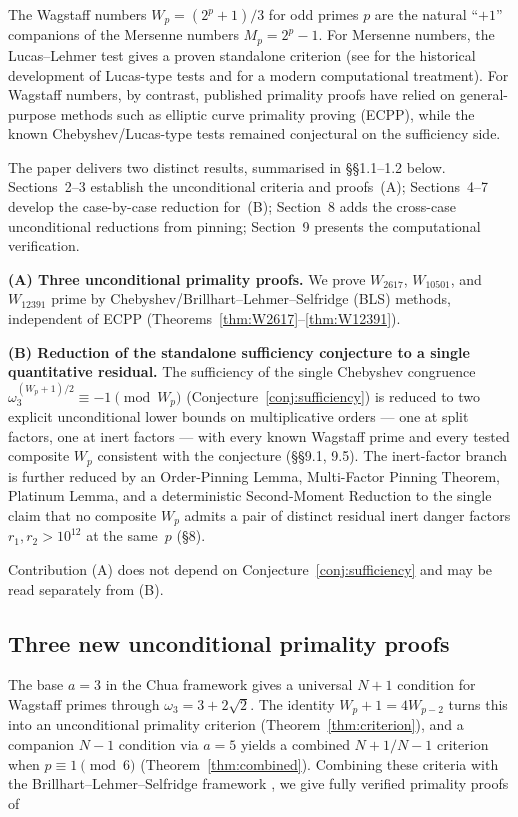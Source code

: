 \documentclass[12pt]{article}
\theoremstyle{plain}
\theoremstyle{definition}
\theoremstyle{remark}
\begin{document}
The Wagstaff numbers \(W_p = (2^p + 1)/3\) for odd primes \(p\) are the
natural ``$+1$'' companions of the Mersenne numbers \(M_p = 2^p-1\).
For Mersenne numbers, the Lucas--Lehmer test \cite{ref12} gives a proven
standalone criterion (see \cite{ref17} for the historical development of
Lucas-type tests and \cite{ref7} for a modern computational treatment). For
Wagstaff numbers, by contrast, published primality proofs have
relied on general-purpose methods such as elliptic curve primality proving (ECPP), while the known
Chebyshev/Lucas-type tests remained conjectural on the sufficiency
side.

The paper delivers two distinct results, summarised in \S\S1.1--1.2
below. Sections~2--3 establish the unconditional criteria and proofs~(A);
Sections~4--7 develop the case-by-case reduction for~(B); Section~8
adds the cross-case unconditional reductions from pinning; Section~9
presents the computational verification.

\textbf{(A) Three unconditional primality proofs.} We prove
\(W_{2617}\), \(W_{10501}\), and \(W_{12391}\) prime by
Chebyshev/Brillhart--Lehmer--Selfridge (BLS) methods, independent of ECPP (Theorems~\ref{thm:W2617}--\ref{thm:W12391}).

\textbf{(B) Reduction of the standalone sufficiency conjecture
to a single quantitative residual.} The sufficiency of the single
Chebyshev congruence \(\omega_3^{(W_p+1)/2} \equiv -1 \pmod{W_p}\)
(Conjecture~\ref{conj:sufficiency}) is reduced to two explicit unconditional lower
bounds on multiplicative orders --- one at split factors, one at
inert factors --- with every known Wagstaff prime and every tested
composite \(W_p\) consistent with the conjecture (\S\S9.1, 9.5). The
inert-factor branch is further reduced by an Order-Pinning Lemma,
Multi-Factor Pinning Theorem, Platinum Lemma, and a deterministic
Second-Moment Reduction to the single claim that no composite
\(W_p\) admits a pair of distinct residual inert danger factors
\(r_1, r_2 > 10^{12}\) at the same~\(p\) (\S8).

Contribution (A) does not depend on Conjecture~\ref{conj:sufficiency} and may be
read separately from (B).

\subsection{Three new unconditional primality proofs}


The base \(a = 3\) in the Chua framework gives a universal \(N+1\)
condition for Wagstaff primes through \(\omega_3 = 3 + 2\sqrt{2}\).
The identity \(W_p + 1 = 4W_{p-2}\) turns this into an unconditional
primality criterion (Theorem~\ref{thm:criterion}), and a companion \(N-1\) condition
via \(a = 5\) yields a combined \(N+1/N-1\) criterion when
\(p \equiv 1 \pmod{6}\) (Theorem~\ref{thm:combined}). Combining these criteria
with the Brillhart--Lehmer--Selfridge framework \cite{ref3}, we
give fully verified primality proofs of
\end{document}
